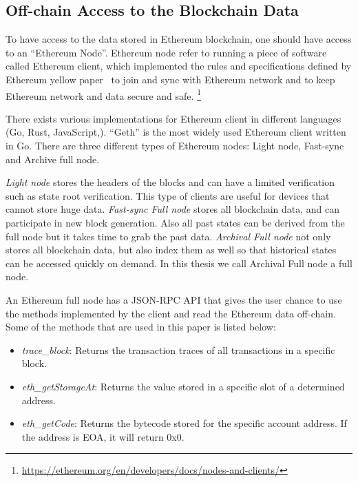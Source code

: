 
\subsection{Off-chain Access to the Blockchain Data}\label{sec:nodes}

To have access to the data stored in Ethereum blockchain, one should have access to an ``Ethereum Node''. Ethereum node refer to running a piece of software called Ethereum client, which implemented the rules and specifications defined by Ethereum yellow paper~\cite{wood2014ethereum} to join and sync with Ethereum network and to keep Ethereum network and data secure and safe.
\footnote{\url{https://ethereum.org/en/developers/docs/nodes-and-clients/}} 

There exists various implementations for Ethereum client in different languages (\eg Go, Rust, JavaScript,\etc). ``Geth'' is the most widely used Ethereum client written in Go. 
There are three different types of Ethereum nodes: Light node, Fast-sync and Archive full node.

\textit{Light node} stores the headers of the blocks and can have a limited verification such as state root verification. This type of clients are useful for devices that cannot store huge data.
\textit{Fast-sync Full node} stores all blockchain data, and can participate in new block generation. Also all past states can be derived from the full node but it takes time to grab the past data.
\textit{Archival Full node} not only stores all blockchain data, but also index them as well so that historical states can be accessed quickly on demand. In this thesis we call Archival Full node a
full node. 

An Ethereum full node has a JSON-RPC API that gives the user chance to use the methods implemented by the client and read the Ethereum data off-chain. Some of the methods that are used in this paper is listed below:

\begin{itemize}
    \item \emph{trace\_block}: Returns the transaction traces of all transactions in a specific block.
    \item \emph{eth\_getStorageAt}: Returns the value stored in a specific slot of a determined address. 
    \item \emph{eth\_getCode}: Returns the bytecode stored for the specific account address. If the address is EOA, it will return 0x0.
\end{itemize}

